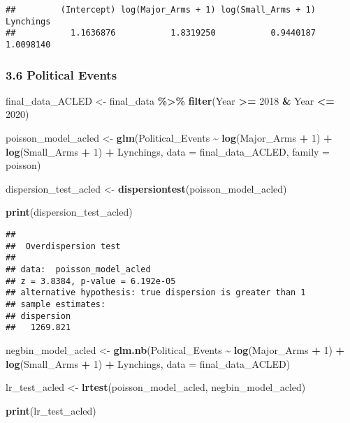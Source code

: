 \documentclass[
  11pt,
]{article}
\newenvironment{Shaded}{\begin{snugshade}}{\end{snugshade}}
\newcommand{\AttributeTok}[1]{\textcolor[rgb]{0.13,0.29,0.53}{#1}}
\newcommand{\DecValTok}[1]{\textcolor[rgb]{0.00,0.00,0.81}{#1}}
\newcommand{\FunctionTok}[1]{\textcolor[rgb]{0.13,0.29,0.53}{\textbf{#1}}}
\newcommand{\NormalTok}[1]{#1}
\newcommand{\OtherTok}[1]{\textcolor[rgb]{0.56,0.35,0.01}{#1}}
\newcommand{\SpecialCharTok}[1]{\textcolor[rgb]{0.81,0.36,0.00}{\textbf{#1}}}
\begin{document}
\begin{verbatim}
##         (Intercept) log(Major_Arms + 1) log(Small_Arms + 1)           Lynchings 
##           1.1636876           1.8319250           0.9440187           1.0098140
\end{verbatim}

\subsubsection{3.6 Political Events}\label{political-events}

\begin{Shaded}
\begin{Highlighting}[]
\NormalTok{final\_data\_ACLED }\OtherTok{\textless{}{-}}\NormalTok{ final\_data }\SpecialCharTok{\%\textgreater{}\%}   
  \FunctionTok{filter}\NormalTok{(Year }\SpecialCharTok{\textgreater{}=} \DecValTok{2018} \SpecialCharTok{\&}\NormalTok{ Year }\SpecialCharTok{\textless{}=} \DecValTok{2020}\NormalTok{)}

\NormalTok{poisson\_model\_acled }\OtherTok{\textless{}{-}} \FunctionTok{glm}\NormalTok{(Political\_Events }\SpecialCharTok{\textasciitilde{}} \FunctionTok{log}\NormalTok{(Major\_Arms }\SpecialCharTok{+} \DecValTok{1}\NormalTok{) }\SpecialCharTok{+} \FunctionTok{log}\NormalTok{(Small\_Arms }\SpecialCharTok{+} \DecValTok{1}\NormalTok{) }\SpecialCharTok{+}\NormalTok{ Lynchings,                            }\AttributeTok{data =}\NormalTok{ final\_data\_ACLED, }\AttributeTok{family =}\NormalTok{ poisson)}

\NormalTok{dispersion\_test\_acled }\OtherTok{\textless{}{-}} \FunctionTok{dispersiontest}\NormalTok{(poisson\_model\_acled)}

\FunctionTok{print}\NormalTok{(dispersion\_test\_acled)}
\end{Highlighting}
\end{Shaded}

\begin{verbatim}
## 
##  Overdispersion test
## 
## data:  poisson_model_acled
## z = 3.8384, p-value = 6.192e-05
## alternative hypothesis: true dispersion is greater than 1
## sample estimates:
## dispersion 
##   1269.821
\end{verbatim}

\begin{Shaded}
\begin{Highlighting}[]
\NormalTok{negbin\_model\_acled }\OtherTok{\textless{}{-}} \FunctionTok{glm.nb}\NormalTok{(Political\_Events }\SpecialCharTok{\textasciitilde{}} \FunctionTok{log}\NormalTok{(Major\_Arms }\SpecialCharTok{+} \DecValTok{1}\NormalTok{) }\SpecialCharTok{+} \FunctionTok{log}\NormalTok{(Small\_Arms }\SpecialCharTok{+} \DecValTok{1}\NormalTok{) }\SpecialCharTok{+}\NormalTok{ Lynchings,                              }\AttributeTok{data =}\NormalTok{ final\_data\_ACLED)}


\NormalTok{lr\_test\_acled }\OtherTok{\textless{}{-}} \FunctionTok{lrtest}\NormalTok{(poisson\_model\_acled, negbin\_model\_acled)}

\FunctionTok{print}\NormalTok{(lr\_test\_acled) }
\end{Highlighting}
\end{Shaded}
\end{document}
